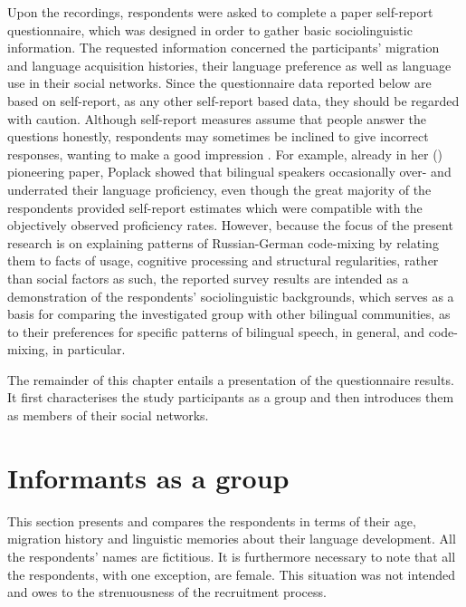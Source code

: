 Upon the recordings, respondents were asked to complete a paper self-report questionnaire, which was designed in order to gather basic sociolinguistic information. The requested information concerned the participants' migration and language acquisition histories, their language preference as well as language use in their social networks. Since the questionnaire data reported below are based on self-report, as any other self-report based data, they should be regarded with caution. Although self-report measures assume that people answer the questions honestly, respondents may sometimes be inclined to give incorrect responses, wanting to make a good impression \citep[cf.][208]{social-psychology}. For example, already in her (\citeyear{poplack-sometimes-1980}) pioneering paper, Poplack showed that bilingual speakers occasionally over- and underrated their language proficiency, even though the great majority of the respondents provided self-report estimates which were compatible with the objectively observed proficiency rates. However, because the focus of the present research is on explaining patterns of Russian-German code-mixing by relating them to facts of usage, cognitive processing and structural regularities, rather than social factors as such, the reported survey results are intended as a demonstration of the respondents' sociolinguistic backgrounds, which serves as a basis for comparing the investigated group with other bilingual communities, as to their preferences for specific patterns of bilingual speech, in general, and code-mixing, in particular.

The remainder of this chapter entails a presentation of the questionnaire results. It first characterises the study participants as a group and then introduces them as members of their social networks.

\section{Informants as a group}
This section presents and compares the respondents in terms of their age, migration history and linguistic memories about their language development. All the respondents' names are fictitious. It is furthermore necessary to note that all the respondents, with one exception, are female. This situation was not intended and owes to the strenuousness of the recruitment process.

